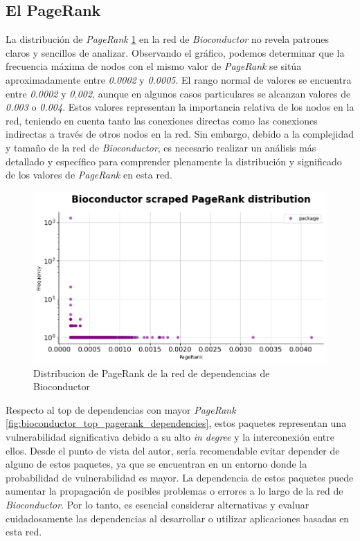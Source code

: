 \subsection{El PageRank}

La distribución de \textit{PageRank} \ref{fig:bioconductor_pagerank_dist} en la red de \textit{Bioconductor} no revela patrones claros
y sencillos de analizar. Observando el gráfico, podemos determinar que la frecuencia máxima de nodos
con el mismo valor de \textit{PageRank} se sitúa aproximadamente entre \textit{0.0002} y \textit{0.0005}.
El rango normal de valores se encuentra entre \textit{0.0002} y \textit{0.002}, aunque en algunos casos
particulares se alcanzan valores de \textit{0.003} o \textit{0.004}. Estos valores representan la importancia
relativa de los nodos en la red, teniendo en cuenta tanto las conexiones directas como las conexiones
indirectas a través de otros nodos en la red. Sin embargo, debido a la complejidad y tamaño de la red
de \textit{Bioconductor}, es necesario realizar un análisis más detallado y específico para comprender
plenamente la distribución y significado de los valores de \textit{PageRank} en esta red.

\begin{figure}[h!]
    \begin{center}
        \includegraphics[width=1\textwidth]{img/bioconductor/pagerank_dist.png}
        \caption{Distribucion de PageRank de la red de dependencias de Bioconductor}
        \label{fig:bioconductor_pagerank_dist}
    \end{center}
\end{figure}


Respecto al top de dependencias con mayor \textit{PageRank} \ref{fig:bioconductor_top_pagerank_dependencies},
estos paquetes representan una vulnerabilidad significativa debido a su alto \textit{in degree} y la interconexión entre ellos. Desde el punto de vista
del autor, sería recomendable evitar depender de alguno de estos paquetes, ya que se encuentran en un entorno
donde la probabilidad de vulnerabilidad es mayor. La dependencia de estos paquetes puede aumentar la propagación
de posibles problemas o errores a lo largo de la red de \textit{Bioconductor}. Por lo tanto, es esencial
considerar alternativas y evaluar cuidadosamente las dependencias al desarrollar o utilizar aplicaciones
basadas en esta red.

